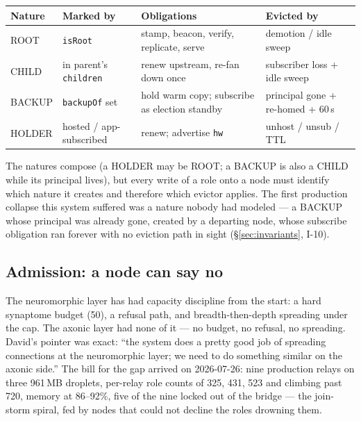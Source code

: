 \documentclass[nobib]{tufte-handout}
\begin{document}
\begin{table}[h]
\scriptsize
\begin{tabular}{@{}llll@{}}
\toprule
Nature & Marked by & Obligations & Evicted by \\
\midrule
ROOT & \texttt{isRoot} & stamp, beacon, verify, replicate, serve & demotion / idle sweep \\
CHILD & in parent's \texttt{children} & renew upstream, re-fan down once & subscriber loss + idle sweep \\
BACKUP & \texttt{backupOf} set & hold warm copy; subscribe as election standby & principal gone + re-homed + 60\,s \\
HOLDER & hosted / app-subscribed & renew; advertise \texttt{hw} & unhost / unsub / TTL \\
\bottomrule
\end{tabular}
\end{table}

The natures compose (a HOLDER may be ROOT; a BACKUP is also a CHILD
while its principal lives), but every write of a role onto a node must
identify which nature it creates and therefore which evictor applies.
The first production collapse this system suffered was a nature nobody
had modeled --- a BACKUP whose principal was already gone, created by a
departing node, whose subscribe obligation ran forever with no eviction
path in sight (\S\ref{sec:invariants}, I-10).

\subsection{Admission: a node can say no}

The neuromorphic layer has had capacity discipline from the start: a
hard synaptome budget (50), a refusal path, and breadth-then-depth
spreading under the cap. The axonic layer had none of it --- no budget,
no refusal, no spreading. David's pointer was exact: ``the system does
a pretty good job of spreading connections at the neuromorphic layer;
we need to do something similar on the axonic side.'' The bill for the
gap arrived on 2026-07-26: nine production relays on three 961\,MB
droplets, per-relay role counts of 325, 431, 523 and climbing past
720, memory at 86--92\%, five of the nine locked out of the bridge ---
the join-storm spiral, fed by nodes that could not decline the roles
drowning them.
\end{document}
